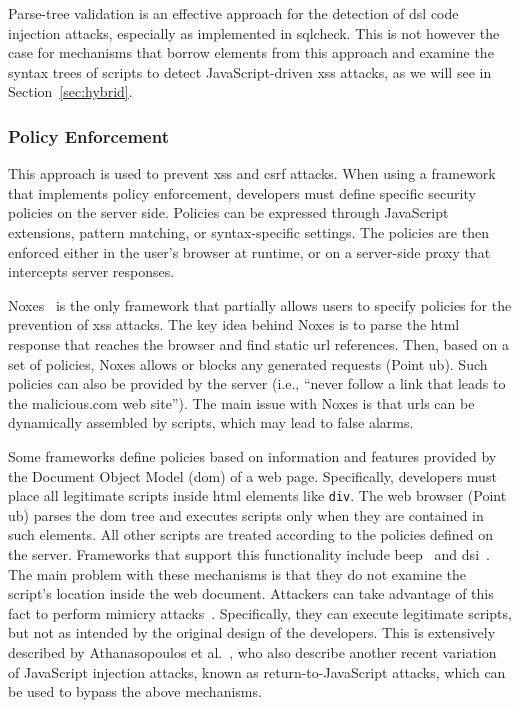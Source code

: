 \documentclass[10pt,journal,compsoc]{IEEEtran}
\begin{document}
Parse-tree validation is an effective approach
for the detection of {\sc dsl} code injection attacks,
especially as implemented in {\sc sql}check.
This is not however the case
for mechanisms that borrow elements from
this approach and examine the syntax trees
of scripts to detect JavaScript-driven {\sc xss} attacks,
as we will see in Section~\ref{sec:hybrid}.

\subsubsection{Policy Enforcement}
\label{sec:policy}

This approach is used to prevent {\sc xss} and {\sc csrf} attacks. When
using a framework that implements policy enforcement, developers must
define specific security policies on the server side. Policies can be
expressed through JavaScript extensions, pattern matching, or
syntax-specific settings. The policies are then enforced either in the user's
browser at runtime, or on a server-side proxy that intercepts server
responses.

Noxes~\cite{KKVJ06,KJKV09} is the only
framework that partially allows
users to specify policies for the prevention of {\sc xss} attacks.
The key idea behind Noxes is to parse
the {\sc html} response that reaches the browser and
find static {\sc url} references. Then, based on
a set of policies, Noxes allows or blocks
any generated requests (Point {\sc ub}). Such policies
can also be provided by the server (i.e., ``never
follow a link that leads to the malicious.com
web site''). The main issue with Noxes is that
{\sc url}s can be dynamically assembled by scripts,
which may lead to false alarms.

Some frameworks define policies based on information and
features provided by the Document Object Model ({\sc dom}) of a web
page. Specifically, developers must place all legitimate scripts
inside {\sc html} elements like {\tt div}. The web browser (Point {\sc
  ub}) parses the {\sc dom} tree and executes scripts only when they
are contained in such elements. All other scripts are treated
according to the policies defined on the server. Frameworks that
support this functionality include {\sc beep}~\cite{TNH07} and {\sc
  dsi}~\cite{NSS06}. The main problem with these mechanisms is that
they do not examine the script's location inside the web document.
Attackers can take advantage of this fact to perform mimicry attacks~\cite{WS02}.
Specifically, they can execute legitimate scripts, but not as intended
by the original design of the developers. This is extensively
described by Athanasopoulos et al.~\cite{APKLM10}, who also describe
another recent variation of JavaScript injection attacks, known as
return-to-JavaScript attacks, which can be used to bypass the above
mechanisms.
\end{document}
